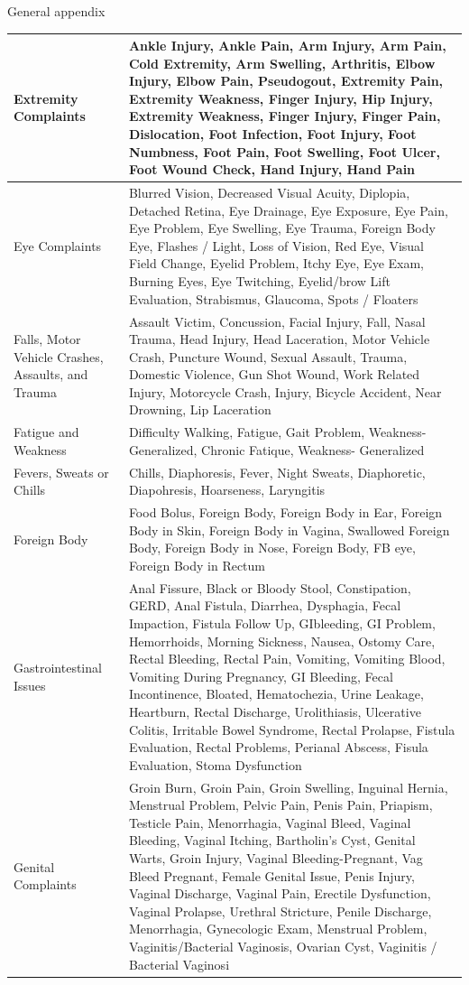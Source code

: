 \documentclass[,,nonblindrev]{informs}
\begin{document}
\begin{APPENDIX}{General appendix}
\begin{longtable}{|p{5cm}|p{12cm}|}
\hline
Extremity Complaints & Ankle Injury, Ankle Pain, Arm Injury, Arm Pain, Cold Extremity, Arm Swelling, Arthritis, Elbow Injury, Elbow Pain, Pseudogout, Extremity Pain, Extremity Weakness, Finger Injury, Hip Injury, Extremity Weakness, Finger Injury, Finger Pain, Dislocation, Foot Infection, Foot Injury, Foot Numbness, Foot Pain, Foot Swelling, Foot Ulcer, Foot Wound Check, Hand Injury, Hand Pain \\
\hline
Eye Complaints & Blurred Vision, Decreased Visual Acuity, Diplopia, Detached Retina, Eye Drainage, Eye Exposure, Eye Pain, Eye Problem, Eye Swelling, Eye Trauma, Foreign Body Eye, Flashes / Light, Loss of Vision, Red Eye, Visual Field Change, Eyelid Problem, Itchy Eye, Eye Exam, Burning Eyes, Eye Twitching, Eyelid/brow Lift Evaluation, Strabismus, Glaucoma, Spots / Floaters \\
\hline
Falls, Motor Vehicle Crashes, Assaults, and Trauma & Assault Victim, Concussion, Facial Injury, Fall, Nasal Trauma, Head Injury, Head Laceration, Motor Vehicle Crash, Puncture Wound, Sexual Assault, Trauma, Domestic Violence, Gun Shot Wound, Work Related Injury, Motorcycle Crash, Injury, Bicycle Accident, Near Drowning, Lip Laceration \\
\hline
Fatigue and Weakness & Difficulty Walking, Fatigue, Gait Problem, Weakness-Generalized, Chronic Fatique, Weakness- Generalized \\
\hline
Fevers, Sweats or Chills & Chills, Diaphoresis, Fever, Night Sweats, Diaphoretic, Diapohresis, Hoarseness, Laryngitis \\
\hline
Foreign Body & Food Bolus, Foreign Body, Foreign Body in Ear, Foreign Body in Skin, Foreign Body in Vagina, Swallowed Foreign Body, Foreign Body in Nose, Foreign Body, FB eye, Foreign Body in Rectum \\
\hline
Gastrointestinal Issues & Anal Fissure, Black or Bloody Stool, Constipation, GERD, Anal Fistula, Diarrhea, Dysphagia, Fecal Impaction, Fistula Follow Up, GIbleeding, GI Problem, Hemorrhoids, Morning Sickness, Nausea, Ostomy Care, Rectal Bleeding, Rectal Pain, Vomiting, Vomiting Blood, Vomiting During Pregnancy, GI Bleeding, Fecal Incontinence, Bloated, Hematochezia, Urine Leakage, Heartburn, Rectal Discharge, Urolithiasis, Ulcerative Colitis, Irritable Bowel Syndrome, Rectal Prolapse, Fistula Evaluation, Rectal Problems, Perianal Abscess, Fisula Evaluation, Stoma Dysfunction \\
\hline
Genital Complaints & Groin Burn, Groin Pain, Groin Swelling, Inguinal Hernia, Menstrual Problem, Pelvic Pain, Penis Pain, Priapism, Testicle Pain, Menorrhagia, Vaginal Bleed, Vaginal Bleeding, Vaginal Itching, Bartholin's Cyst, Genital Warts, Groin Injury, Vaginal Bleeding-Pregnant, Vag Bleed Pregnant, Female Genital Issue, Penis Injury, Vaginal Discharge, Vaginal Pain, Erectile Dysfunction, Vaginal Prolapse, Urethral Stricture, Penile Discharge, Menorrhagia, Gynecologic Exam, Menstrual Problem, Vaginitis/Bacterial Vaginosis, Ovarian Cyst, Vaginitis / Bacterial Vaginosi \\

\end{longtable}
\end{APPENDIX}
\end{document}

